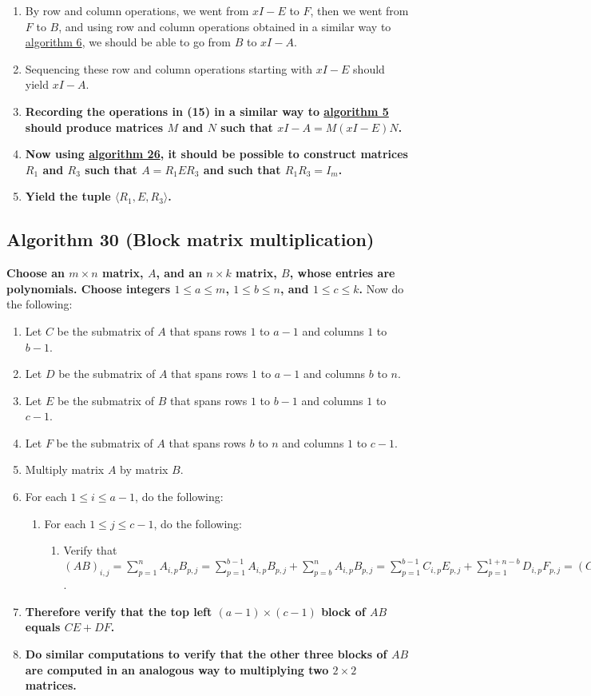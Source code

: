 \documentclass[twocolumn]{article}
\begin{document}
\begin{enumerate}
\begin{enumerate}
				\end{enumerate}
				\item By row and column operations, we went from $xI-E$ to $F$, then we went from $F$ to $B$, and using row and column operations obtained in a similar way to \hyperref[sec:algorithm 6]{algorithm 6}, we should be able to go from $B$ to $xI-A$.
				\item Sequencing these row and column operations starting with $xI-E$ should yield $xI-A$.
				\item \textbf{Recording the operations in (15) in a similar way to \hyperref[sec:algorithm 5]{algorithm 5} should produce matrices $M$ and $N$ such that $xI-A=M(xI-E)N$.}
				\item \textbf{Now using \hyperref[sec:algorithm 26]{algorithm 26}, it should be possible to construct matrices $R_1$ and $R_3$ such that $A=R_1ER_3$ and such that $R_1R_3=I_m$.}
				\item \textbf{Yield the tuple $\langle R_1,E,R_3\rangle$.}
			\end{enumerate}
		\subsection{Algorithm 30 (Block matrix multiplication)}\label{sec:algorithm 30}
			\textbf{Choose an $m\times n$ matrix, $A$, and an $n\times k$ matrix, $B$, whose entries are polynomials. Choose integers $1\le a\le m$, $1\le b\le n$, and $1\le c\le k$.} Now do the following:
			\begin{enumerate}
				\item Let $C$ be the submatrix of $A$ that spans rows $1$ to $a-1$ and columns $1$ to $b-1$.
				\item Let $D$ be the submatrix of $A$ that spans rows $1$ to $a-1$ and columns $b$ to $n$.
				\item Let $E$ be the submatrix of $B$ that spans rows $1$ to $b-1$ and columns $1$ to $c-1$.
				\item Let $F$ be the submatrix of $A$ that spans rows $b$ to $n$ and columns $1$ to $c-1$.
				\item Multiply matrix $A$ by matrix $B$.
				\item For each $1\le i\le a-1$, do the following:
				\begin{enumerate}
					\item For each $1\le j\le c-1$, do the following:
						\begin{enumerate}
							\item Verify that $(AB)_{i,j}=\sum_{p=1}^n A_{i,p}B_{p,j}=\sum_{p=1}^{b-1} A_{i,p}B_{p,j}+\sum_{p=b}^n A_{i,p}B_{p,j}=\sum_{p=1}^{b-1} C_{i,p}E_{p,j}+\sum_{p=1}^{1+n-b} D_{i,p}F_{p,j}=(CE)_{i,j}+(DF)_{i,j}$.
						\end{enumerate}
				\end{enumerate}
				\item \textbf{Therefore verify that the top left $(a-1)\times(c-1)$ block of $AB$ equals $CE+DF$.}
				\item \textbf{Do similar computations to verify that the other three blocks of $AB$ are computed in an analogous way to multiplying two $2\times 2$ matrices.}
			\end{enumerate}
\end{document}
